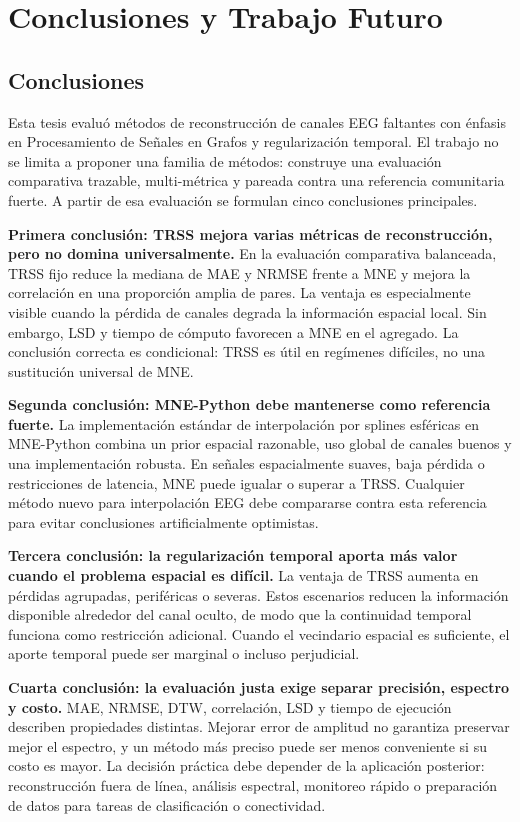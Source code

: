 \chapter{Conclusiones y Trabajo Futuro}
\label{ch:conclusiones}

\section{Conclusiones}

Esta tesis evaluó métodos de reconstrucción de canales EEG faltantes con énfasis en Procesamiento de Señales en Grafos y regularización temporal. El trabajo no se limita a proponer una familia de métodos: construye una evaluación comparativa trazable, multi-métrica y pareada contra una referencia comunitaria fuerte. A partir de esa evaluación se formulan cinco conclusiones principales.

\textbf{Primera conclusión: TRSS mejora varias métricas de reconstrucción, pero no domina universalmente.} En la evaluación comparativa balanceada, TRSS fijo reduce la mediana de MAE y NRMSE frente a MNE y mejora la correlación en una proporción amplia de pares. La ventaja es especialmente visible cuando la pérdida de canales degrada la información espacial local. Sin embargo, LSD y tiempo de cómputo favorecen a MNE en el agregado. La conclusión correcta es condicional: TRSS es útil en regímenes difíciles, no una sustitución universal de MNE.

\textbf{Segunda conclusión: MNE-Python debe mantenerse como referencia fuerte.} La implementación estándar de interpolación por splines esféricas en MNE-Python combina un prior espacial razonable, uso global de canales buenos y una implementación robusta. En señales espacialmente suaves, baja pérdida o restricciones de latencia, MNE puede igualar o superar a TRSS. Cualquier método nuevo para interpolación EEG debe compararse contra esta referencia para evitar conclusiones artificialmente optimistas.

\textbf{Tercera conclusión: la regularización temporal aporta más valor cuando el problema espacial es difícil.} La ventaja de TRSS aumenta en pérdidas agrupadas, periféricas o severas. Estos escenarios reducen la información disponible alrededor del canal oculto, de modo que la continuidad temporal funciona como restricción adicional. Cuando el vecindario espacial es suficiente, el aporte temporal puede ser marginal o incluso perjudicial.

\textbf{Cuarta conclusión: la evaluación justa exige separar precisión, espectro y costo.} MAE, NRMSE, DTW, correlación, LSD y tiempo de ejecución describen propiedades distintas. Mejorar error de amplitud no garantiza preservar mejor el espectro, y un método más preciso puede ser menos conveniente si su costo es mayor. La decisión práctica debe depender de la aplicación posterior: reconstrucción fuera de línea, análisis espectral, monitoreo rápido o preparación de datos para tareas de clasificación o conectividad.

